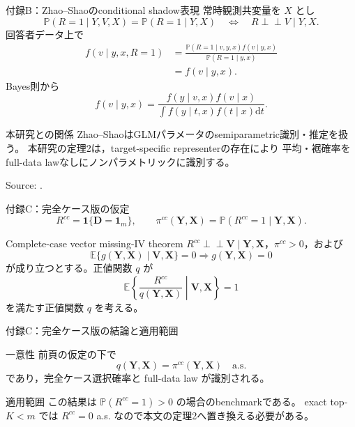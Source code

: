 \documentclass[aspectratio=169,10pt]{beamer}
\newcommand{\E}{\mathbb{E}}
\newcommand{\Prb}{\mathbb{P}}
\newcommand{\1}{\mathbf{1}}
\newcommand{\indep}{\mathrel{\perp\!\!\!\perp}}
\newcommand{\Y}{\bm{Y}}
\newcommand{\V}{\bm{V}}
\newcommand{\X}{\bm{X}}
\newcommand{\D}{\bm{D}}
\newcommand{\dd}{\mathrm d}
\begin{document}
\begin{frame}[shrink=7]{付録B：Zhao--Shaoのconditional shadow表現}
常時観測共変量を $X$ とし
\[
\Prb(R=1\mid Y,V,X)=\Prb(R=1\mid Y,X)
\quad\Longleftrightarrow\quad
R\indep V\mid Y,X.
\]
回答者データ上で
\[
\begin{aligned}
f(v\mid y,x,R=1)
&=
\frac{\Prb(R=1\mid v,y,x)f(v\mid y,x)}
{\Prb(R=1\mid y,x)}\\
&=f(v\mid y,x).
\end{aligned}
\]
Bayes則から
\[
f(v\mid y,x)
=
\frac{f(y\mid v,x)f(v\mid x)}
{\int f(y\mid t,x)f(t\mid x)\dd t}.
\]
\begin{alertblock}{本研究との関係}
Zhao--ShaoはGLMパラメータのsemiparametric識別・推定を扱う。
本研究の定理2は，target-specific representerの存在により
平均・裾確率をfull-data lawなしにノンパラメトリックに識別する。
\end{alertblock}
{\tiny Source: \textcite{ZhaoShao2015}.}
\end{frame}

\begin{frame}{付録C：完全ケース版の仮定}
\[
R^{cc}=\1\{\D=\bm1_m\},
\qquad
\pi^{cc}(\Y,\X)=\Prb(R^{cc}=1\mid\Y,\X).
\]
\begin{block}{Complete-case vector missing-IV theorem}
$R^{cc}\indep\V\mid\Y,\X$，$\pi^{cc}>0$，および
\[
\E\{g(\Y,\X)\mid\V,\X\}=0\Rightarrow g(\Y,\X)=0
\]
が成り立つとする。正値関数 $q$ が
\[
\E\left\{\frac{R^{cc}}{q(\Y,\X)}\middle|\V,\X\right\}=1
\]
を満たす正値関数 $q$ を考える。
\end{block}
\end{frame}

\begin{frame}{付録C：完全ケース版の結論と適用範囲}
\begin{block}{一意性}
前頁の仮定の下で
\[
q(\Y,\X)=\pi^{cc}(\Y,\X)\quad\text{a.s.}
\]
であり，完全ケース選択確率と full-data law が識別される。
\end{block}
\begin{alertblock}{適用範囲}
この結果は $\Prb(R^{cc}=1)>0$ の場合のbenchmarkである。
exact top-$K<m$ では $R^{cc}=0$ a.s. なので本文の定理2へ置き換える必要がある。
\end{alertblock}
\end{frame}
\end{document}
